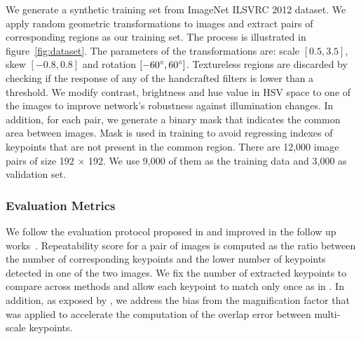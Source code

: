 We generate a synthetic training set from ImageNet ILSVRC 2012 \cite{RussakovskyDSKSMHKKBBF14} dataset. We apply random geometric transformations to images and extract pairs of corresponding regions as our training set. The process is illustrated in figure~\ref{fig:dataset}. The parameters of the transformations are: scale $[0.5, 3.5]$, skew  $[-0.8, 0.8]$ and rotation $[-60^\circ, 60^\circ]$. Textureless regions are discarded by checking if the response of any of the handcrafted filters is lower than a threshold. We modify contrast, brightness and hue value in HSV space to one of the images to improve network's robustness against illumination changes. In addition, for each pair, we generate a binary mask that indicates the common area between images. Mask is used in training to avoid regressing indexes of keypoints that are not present in the common region. There are 12,000 image pairs of size 192 $\times$ 192. We use 9,000 of them as the training data and 3,000 as validation set.


\subsubsection{Evaluation Metrics}
\label{subsec:Evaluation}

We follow the evaluation protocol proposed in \cite{mikolajczykpami2005} and improved in the follow up works~\cite{LIFT,Karel_Vedaldi_ECCV_16,Zhang_Felix_CVPR_17,Karel_Vedaldi_BMVC_18}. Repeatability score for a pair of images is computed as the ratio between the number of corresponding keypoints and the lower number of keypoints detected in one of the two images. We fix the number of extracted keypoints to compare across methods and allow each keypoint to match only once as in \cite{FASTER, TILDE}. In addition, as exposed by \cite{Karel_Vedaldi_BMVC_18}, we address the bias from the magnification factor that was applied to accelerate the computation of the overlap error between multi-scale keypoints.

